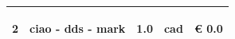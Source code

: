 \documentclass[a4paper]{article}
\begin{document}
\begin{tabular}{ | L{10mm} |  L{86mm} | L{12mm} | L{12mm} | L{16mm} | }
                            
                              \vspace{2.5mm}
                              \begin{spacing}{0}
                           2
                              \end{spacing} &
                              \vspace{2.5mm}
                              \begin{spacing}{0}
                           ciao - dds - mark
                              \end{spacing} &
                              \vspace{2.5mm}
                              \begin{spacing}{0}
                           1.0
                              \end{spacing} &
                              \vspace{2.5mm}
                              \begin{spacing}{0}
                           cad
                              \end{spacing} &
                              \vspace{2.5mm}
                              \begin{spacing}{0}
                                \euro\hfill 
                            0.0
                              \end{spacing} \\
                              \hline

                            
                          \end{tabular}
\end{document}
